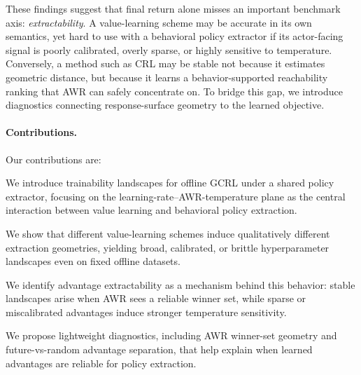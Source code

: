 These findings suggest that final return alone misses an important benchmark axis: \emph{extractability}.
A value-learning scheme may be accurate in its own semantics, yet hard to use with a behavioral policy extractor if its
actor-facing signal is poorly calibrated, overly sparse, or highly sensitive to temperature.
Conversely, a method such as CRL may be stable not because it estimates geometric distance, but because it learns a behavior-supported
reachability ranking that AWR can safely concentrate on.
To bridge this gap, we introduce diagnostics connecting response-surface geometry to the learned objective.

\paragraph{Contributions.}
Our contributions are:
\begin{inparaenum}[(i)]
    \item We introduce trainability landscapes for offline GCRL under a shared policy extractor, focusing on the learning-rate--AWR-temperature plane as
    the central interaction between value learning and behavioral policy extraction.
    \item We show that different value-learning schemes induce qualitatively different extraction geometries, yielding broad, calibrated, or brittle hyperparameter landscapes even on fixed offline datasets.
    \item We identify advantage extractability as a mechanism behind this behavior: stable landscapes arise when AWR sees a reliable winner set, while sparse or miscalibrated advantages induce stronger temperature sensitivity.
    \item We propose lightweight diagnostics, including AWR winner-set geometry and future-vs-random advantage separation, that help explain when learned advantages are reliable for policy extraction.
\end{inparaenum}
